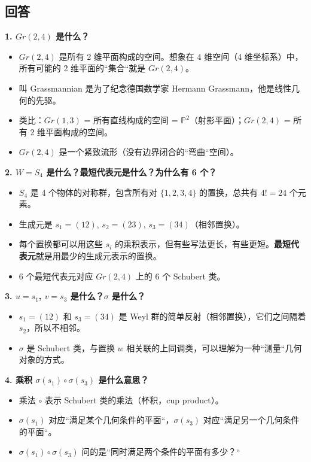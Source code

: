 \subsection{回答}
\textbf{1. $Gr(2,4)$ 是什么？}
\begin{itemize}
\item $Gr(2,4)$ 是所有 2 维平面构成的空间。想象在 4 维空间（4 维坐标系）中，所有可能的 2 维平面的``集合``就是 $Gr(2,4)$。
\item 叫 Grassmannian 是为了纪念德国数学家 Hermann Grassmann，他是线性几何的先驱。
\item 类比：$Gr(1,3)$ = 所有直线构成的空间 = $\mathbb{P}^2$（射影平面）；$Gr(2,4)$ = 所有 2 维平面构成的空间。
\item $Gr(2,4)$ 是一个紧致流形（没有边界闭合的``弯曲``空间）。
\end{itemize}

\textbf{2. $W = S_4$ 是什么？最短代表元是什么？为什么有 6 个？}
\begin{itemize}
\item $S_4$ 是 4 个物体的对称群，包含所有对 $\{1,2,3,4\}$ 的置换，总共有 $4! = 24$ 个元素。
\item 生成元是 $s_1 = (12)$, $s_2 = (23)$, $s_3 = (34)$（相邻置换）。
\item 每个置换都可以用这些 $s_i$ 的乘积表示，但有些写法更长，有些更短。\textbf{最短代表元}就是用最少的生成元表示的置换。
\item 6 个最短代表元对应 $Gr(2,4)$ 上的 6 个 Schubert 类。
\end{itemize}

\textbf{3. $u = s_1$, $v = s_3$ 是什么？$\sigma$ 是什么？}
\begin{itemize}
\item $s_1 = (12)$ 和 $s_3 = (34)$ 是 Weyl 群的简单反射（相邻置换），它们之间隔着 $s_2$，所以不相邻。
\item $\sigma$ 是 Schubert 类，与置换 $w$ 相关联的上同调类，可以理解为一种``测量``几何对象的方式。
\end{itemize}

\textbf{4. 乘积 $\sigma(s_1) \circ \sigma(s_3)$ 是什么意思？}
\begin{itemize}
\item 乘法 $\circ$ 表示 Schubert 类的乘法（杯积，cup product）。
\item $\sigma(s_1)$ 对应``满足某个几何条件的平面``，$\sigma(s_3)$ 对应``满足另一个几何条件的平面``。
\item $\sigma(s_1) \circ \sigma(s_3)$ 问的是``同时满足两个条件的平面有多少？``
\end{itemize}

